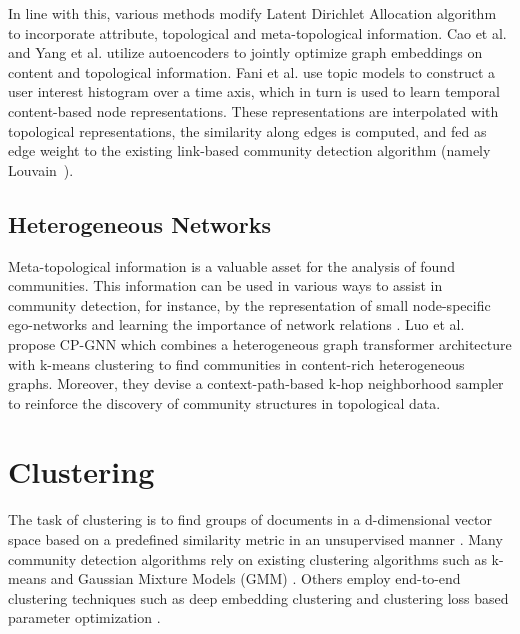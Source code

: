In line with this, various methods \cite{liuCommunityDetectionBased2014, sunRelationStrengthAwareClustering2012} modify Latent Dirichlet Allocation algorithm to incorporate attribute, topological and meta-topological information.
Cao et al. \cite{caoIncorporatingNetworkStructure2018} and Yang et al. \cite{yangGraphClusteringDynamic2017} utilize autoencoders to jointly optimize graph embeddings on content and topological information.
Fani et al. \cite{faniUserCommunityDetection2020} use topic models to construct a user interest histogram over a time axis, which in turn is used to learn temporal content-based node representations. 
These representations are interpolated with topological representations, the similarity along edges is computed, and fed as edge weight to the existing link-based community detection algorithm (namely Louvain~\cite{blondelFastUnfoldingCommunities2008}).


\subsection{Heterogeneous Networks}
Meta-topological information is a valuable asset for the analysis of found communities. 
This information can be used in various ways to assist in community detection, for instance, by the representation of small node-specific ego-networks \cite{huangInformationFusionOriented2022} and learning the importance of network relations \cite{sunRelationStrengthAwareClustering2012}. 
%
Luo et al. \cite{luoDetectingCommunitiesHeterogeneous2021} propose CP-GNN which combines a heterogeneous graph transformer architecture with k-means clustering to find communities in content-rich heterogeneous graphs. Moreover, they devise a context-path-based k-hop neighborhood sampler to reinforce the discovery of community structures in topological data.  

\section{Clustering}
The task of clustering is to find groups of documents in a d-dimensional vector space based on a predefined similarity metric in an unsupervised manner \cite{minSurveyClusteringDeep2018}.
Many community detection algorithms rely on existing clustering algorithms such as k-means \cite{luoDetectingCommunitiesHeterogeneous2021, caoIncorporatingNetworkStructure2018, tianLearningDeepRepresentations2014, kozdobaCommunityDetectionMeasure2015, yangModularityBasedCommunity2016} and Gaussian Mixture Models (GMM) \cite{cavallariLearningCommunityEmbedding2017, choongLearningCommunityStructure2018}. Others employ end-to-end clustering techniques such as deep embedding clustering \cite{yangGraphClusteringDynamic2017} and clustering loss based parameter optimization \cite{rozemberczkiGEMSECGraphEmbedding2019, zhangCommDGICommunityDetection2020}.


